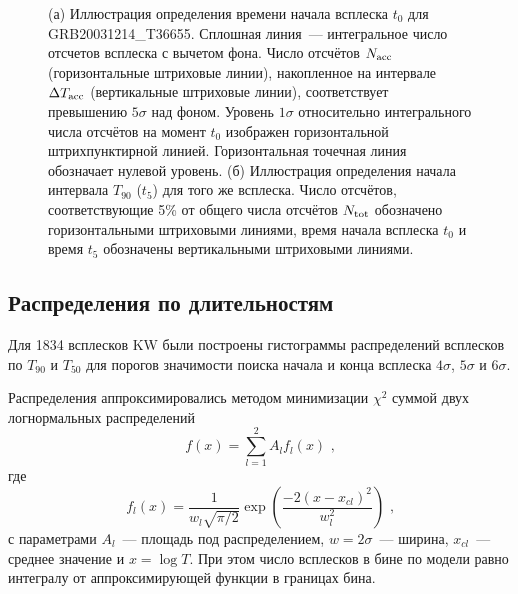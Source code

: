 \begin{figure}[h]
  \begin{minipage}[h]{0.5\textwidth}
  \end{minipage}
  \hfill
  \begin{minipage}[h]{0.5\textwidth}
  \end{minipage}  
  \caption{
  (а) Иллюстрация определения времени начала всплеска $t_0$ для GRB20031214\_T36655. 
  Сплошная линия~--- интегральное число отсчетов всплеска с вычетом фона. 
  Число отсчётов $N_{\mathrm{acc}}$ (горизонтальные штриховые линии), 
  накопленное на интервале $\Delta T_{\mathrm{acc}}$ (вертикальные штриховые линии), 
  соответствует превышению $5\sigma$ над фоном. Уровень $1\sigma$ относительно интегрального 
  числа отсчётов на момент $t_0$  изображен горизонтальной штрихпунктирной линией. 
  Горизонтальная точечная линия обозначает нулевой уровень.
  (б) Иллюстрация определения начала интервала $T_{90}$ ($t_5$) для того же всплеска.
  Число отсчётов, соответствующие 5\% от общего числа отсчётов $N_{\mathrm{tot}}$ 
  обозначено горизонтальными штриховыми линиями, время начала всплеска $t_0$ и время $t_5$ 
  обозначены вертикальными штриховыми линиями. \label{fig:T100_calculation} }
\end{figure}

\subsection{Распределения по длительностям}
Для 1834 всплесков KW были построены гистограммы распределений всплесков по $T_{90}$ и $T_{50}$ 
для порогов значимости поиска начала и конца всплеска $4\sigma$, $5\sigma$ и $6\sigma$. 

Распределения  аппроксимировались методом минимизации $\chi^2$ суммой двух логнормальных распределений
\begin{equation}
f(x) = \sum_{l=1}^{2} A_l f_l(x) \mbox{ ,}
\end{equation}
где
\begin{equation}
f_l(x) = \frac{1}{w_l \sqrt{\pi/2}} \exp\left(\frac{-2(x-x_{cl})^2}{w_l^2}\right) \mbox{ ,}
\end{equation}
с параметрами $A_l$~--- площадь под распределением, $w=2\sigma$~--- ширина, $x_{cl}$~--- среднее значение и 
$x=\log T$. При этом число всплесков в бине по модели равно  интегралу от аппроксимирующей функции в границах бина. 

